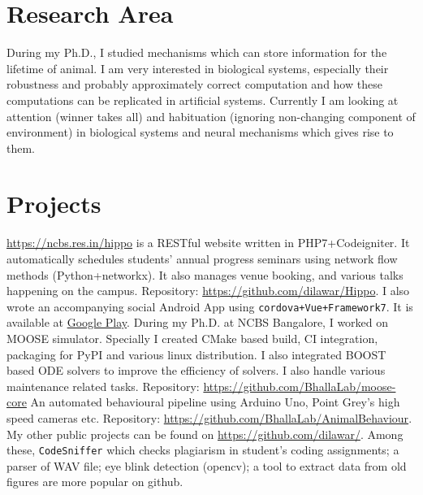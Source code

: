 \documentclass[11pt,a4paper, colorlinks=true, linkcolor=cyan]{moderncv}
\begin{document}
\section{Research Area}
{}{}{}
{
    During my Ph.D., I studied mechanisms which can store information for the lifetime
    of animal. I am very interested in biological systems, especially their
    robustness and probably approximately correct computation and how these
    computations can be replicated in artificial systems.
    Currently I am looking at attention (winner takes all) and habituation (ignoring non-changing
    component of environment) in biological systems and neural mechanisms which
    gives rise to them.
}

\section{Projects}
{}{}{}
{
    \href{NCBS Hippo}{https://ncbs.res.in/hippo} is a RESTful
    website written in PHP7+Codeigniter. It automatically schedules students'
    annual progress seminars using network flow methods (Python+networkx). It also
    manages venue booking, and various talks happening on the campus.
    Repository: \url{https://github.com/dilawar/Hippo}.
    I also wrote an accompanying social Android App using
    \texttt{cordova+Vue+Framework7}. It is available at
    \href{https://play.google.com/store/apps/details?id=com.dilawar.hippo}{Google Play}.
}
{}{}{}
{
    During my Ph.D. at NCBS Bangalore, I worked on MOOSE simulator. Specially I
    created CMake based build, CI integration, packaging for PyPI and various
    linux distribution. I also integrated BOOST based ODE solvers to improve the
    efficiency of solvers. I also handle various maintenance related tasks.
    Repository: \url{https://github.com/BhallaLab/moose-core}
}
{}{}{}
{
    An automated behavioural pipeline using Arduino Uno, Point Grey's high speed
    cameras etc.
    Repository: \url{https://github.com/BhallaLab/AnimalBehaviour}.
}
{}{}{}
{
    My other public projects can be found on \url{https://github.com/dilawar/}.
    Among these, \texttt{CodeSniffer} which checks plagiarism in student's coding
    assignments; a parser of WAV file; eye blink detection (opencv); a tool to
    extract data from old figures are more popular on github.
}
\end{document}
